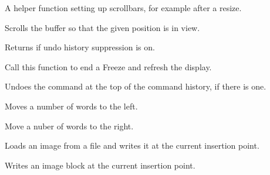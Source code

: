
A helper function setting up scrollbars, for example after a resize.

\label{wxrichtextctrlshowposition}


Scrolls the buffer so that the given position is in view.

\label{wxrichtextctrlsuppressingundo}


Returns \true if undo history suppression is on.

\label{wxrichtextctrlthaw}


Call this function to end a Freeze and refresh the display.

\label{wxrichtextctrlundo}


Undoes the command at the top of the command history, if there is one.

\label{wxrichtextctrlwordleft}


Moves a number of words to the left.

\label{wxrichtextctrlwordright}


Move a nuber of words to the right.

\label{wxrichtextctrlwriteimage}


Loads an image from a file and writes it at the current insertion point.


Writes an image block at the current insertion point.


